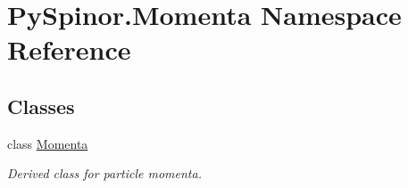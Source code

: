 \hypertarget{namespace_py_spinor_1_1_momenta}{}\section{Py\+Spinor.\+Momenta Namespace Reference}
\label{namespace_py_spinor_1_1_momenta}
\subsection*{Classes}
\begin{DoxyCompactItemize}
\item 
class \hyperlink{class_py_spinor_1_1_momenta_1_1_momenta}{Momenta}
\begin{DoxyCompactList}\small\item\em Derived class for particle momenta. \end{DoxyCompactList}\end{DoxyCompactItemize}
